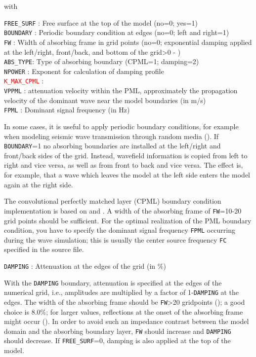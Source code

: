 with

\texttt{FREE\_SURF} : Free surface at the top of the model (no=0; yes=1)\\
\texttt{BOUNDARY} : Periodic boundary condition at edges (no=0; left and right=1)\\ 
\texttt{FW} : Width of absorbing frame in grid points (no=0; exponential damping applied at the left/right, front/back, and bottom of the grid>0 - \cite{cerjan:85})\\
\texttt{ABS\_TYPE}: Type of absorbing boundary (CPML=1; damping=2)\\
\texttt{NPOWER} : Exponent for calculation of damping profile \\
\texttt{\textcolor{red}{K\_MAX\_CPML}} : \\
\texttt{VPPML} : attenuation velocity within the PML, approximately the propagation velocity of the dominant wave near the model boundaries (in m/s)\\
\texttt{FPML} : Dominant signal frequency (in Hz)

In some cases, it is useful to apply periodic boundary conditions, for example when modeling seismic wave transmission through random media (\cite{bohlen:02}). If \texttt{BOUNDARY}=1 no absorbing boundaries are installed at the left/right and front/back sides of the grid. Instead, wavefield information is copied from left to right and vice versa, as well as from front to back and vice versa. The effect is, for example, that a wave which leaves the model at the left side enters the model again at the right side.

The convolutional perfectly matched layer (CPML) boundary condition implementation is based on \citet{komatitsch:07} and \citet{martin:09}. A width of the absorbing frame of \texttt{FW}=10-20 grid points should be sufficient. For the optimal realization of the PML boundary condition, you have to specify the dominant signal frequency \texttt{FPML} occurring during the wave simulation; this is usually the center source frequency \texttt{FC} specified in the source file.

\texttt{DAMPING} : Attenuation at the edges of the grid (in \%)

With the \texttt{DAMPING} boundary, attenuation is specified at the edges of the numerical grid, i.e., amplitudes are multiplied by a factor of 1-\texttt{DAMPING} at the edges. The width of the absorbing frame should be \texttt{FW}>20 gridpoints (\cite{cerjan:85}); a good choice is 8.0$\%$; for larger values, reflections at the onset of the absorbing frame might occur (\cite{cerjan:85}). In order to avoid such an impedance contrast between the model domain and the absorbing boundary layer, \texttt{FW} should increase and \texttt{DAMPING} should decrease. If \texttt{FREE\_SURF}=0, damping is also applied at the top of the model.

